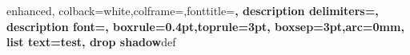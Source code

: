 \usepackage{xcolor} 					%
\usepackage{graphicx}					%
\usepackage{array} 						%
\usepackage{rotating} 					%
\usepackage{adjustbox}					%
\usepackage{booktabs}					%
\usepackage{tabularx}					%
\usepackage{multirow}					%
\usepackage{tablefootnote}				%
\usepackage{subcaption} 				%


\usepackage{paralist} 					%
\usepackage[withpage]{acronym}			%
\usepackage{fancybox}					%
\usepackage[most]{tcolorbox}			%
\usepackage{layouts}					%


%
{enhanced, colback=white,colframe=\fillTwo,fonttitle=\bfseries, description delimiters={\flqq}{\frqq}, description font=\mdseries\ttfamily, boxrule=0.4pt,toprule=3pt, boxsep=3pt,arc=0mm, list text={test}, drop shadow}{def}


